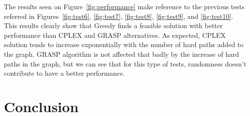 \documentclass[11pt,a4paper]{article}
\begin{document}
The results seen on Figure~\ref{fig:performance} make reference to the previous tests referred in Figures~\ref{fig:test6}, \ref{fig:test7}, \ref{fig:test8}, \ref{fig:test9}, and \ref{fig:test10}. This results clearly show that Greedy finds a feasible solution with better performance than CPLEX and GRASP alternatives. As expected, CPLEX solution tends to increase exponentially with the number of hard paths added to the graph. GRASP algorithm is not affected that badly by the increase of hard paths in the graph, but we can see that for this type of tests, randomness doesn't contribute to have a better performance.

\section{Conclusion}
\end{document}
